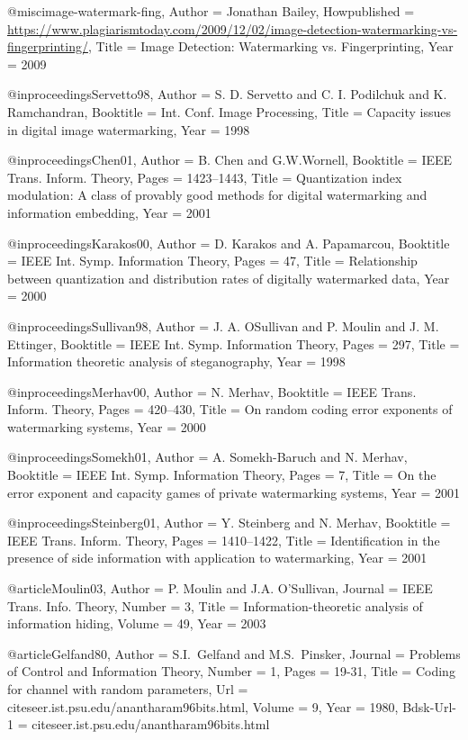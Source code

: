 {{{{{{{{{@misc{image-watermark-fing,
	Author = {Jonathan Bailey},
	Howpublished = {\url{https://www.plagiarismtoday.com/2009/12/02/image-detection-watermarking-vs-fingerprinting/}},
	Title = {{Image Detection: Watermarking vs. Fingerprinting}},
	Year = {2009}}

@inproceedings{Servetto98,
	Author = {S. D. Servetto and C. I. Podilchuk and K. Ramchandran},
	Booktitle = {Int. Conf. Image Processing},
	Title = {Capacity issues in digital image watermarking},
	Year = {1998}}

@inproceedings{Chen01,
	Author = {B. Chen and G.W.Wornell},
	Booktitle = {IEEE Trans. Inform. Theory},
	Pages = {1423--1443},
	Title = {Quantization index modulation: A class of provably good methods for digital watermarking and information embedding},
	Year = {2001}}

@inproceedings{Karakos00,
	Author = {D. Karakos and A. Papamarcou},
	Booktitle = {IEEE Int. Symp. Information Theory},
	Pages = {47},
	Title = {Relationship between quantization and distribution rates of digitally watermarked data},
	Year = {2000}}

@inproceedings{Sullivan98,
	Author = {J. A. OSullivan and P. Moulin and J. M. Ettinger},
	Booktitle = {IEEE Int. Symp. Information Theory},
	Pages = {297},
	Title = {Information theoretic analysis of steganography},
	Year = {1998}}

@inproceedings{Merhav00,
	Author = {N. Merhav},
	Booktitle = {IEEE Trans. Inform. Theory},
	Pages = {420--430},
	Title = {On random coding error exponents of watermarking systems},
	Year = {2000}}

@inproceedings{Somekh01,
	Author = {A. Somekh-Baruch and N. Merhav},
	Booktitle = {IEEE Int. Symp. Information Theory},
	Pages = {7},
	Title = {On the error exponent and capacity games of private watermarking systems},
	Year = {2001}}

@inproceedings{Steinberg01,
	Author = {Y. Steinberg and N. Merhav},
	Booktitle = {IEEE Trans. Inform. Theory},
	Pages = {1410--1422},
	Title = {Identification in the presence of side information with application to watermarking},
	Year = {2001}}

@article{Moulin03,
	Author = {P. Moulin and J.A. O'Sullivan},
	Journal = {IEEE Trans. Info. Theory},
	Number = {3},
	Title = {Information-theoretic analysis of information hiding},
	Volume = 49,
	Year = 2003}

@article{Gelfand80,
	Author = {S.I.~Gelfand and M.S.~Pinsker},
	Journal = {Problems of Control and Information Theory},
	Number = {1},
	Pages = {19-31},
	Title = {{Coding for channel with random parameters}},
	Url = {citeseer.ist.psu.edu/anantharam96bits.html},
	Volume = {9},
	Year = {1980},
	Bdsk-Url-1 = {citeseer.ist.psu.edu/anantharam96bits.html}}

}}}}}}}}}
